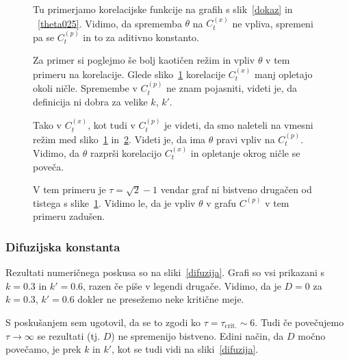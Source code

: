 \documentclass[a4paper, 12pt]{article}
\begin{document}
\begin{figure}[H]\centering
	
	\caption{Tu primerjamo korelacijske funkcije na grafih s slik~\ref{dokaz} in ~\ref{theta025}. Vidimo, da sprememba
		$\theta$ na $C^{(x)}_t$ ne vpliva, spremeni pa se $C^{(p)}_t$ in to za aditivno konstanto.}
	\label{korelacije}
\end{figure}

\begin{figure}[H]\centering
	
	\caption{Za primer si poglejmo \v se bolj kaoti\v cen re\v zim in vpliv $\theta$ v tem primeru na korelacije.
		Glede sliko~\ref{korelacije} korelacije $C^{(x)}_t$ manj opletajo okoli ni\v cle. Spremembe v
		$C^{(p)}_t$ ne znam pojasniti, videti je, da definicija ni dobra za velike $k$, $k'$.}
	\label{korelacije2}
\end{figure}

\begin{figure}[H]\centering
	
	\caption{Tako v $C^{(x)}_t$, kot tudi v $C^{(p)}_t$ je videti, da smo naleteli na vmesni re\v zim med
		sliko~\ref{korelacije} in~\ref{korelacije2}. Videti je, da ima $\theta$ pravi vpliv na $C^{(p)}_t$.
		Vidimo, da $\theta$ razpr\v si korelacijo $C^{(x)}_t$ in opletanje okrog ni\v cle se pove\v ca.}
	\label{korelacije3}
\end{figure}

\begin{figure}[H]\centering
	
	\caption{V tem primeru je $\tau = \sqrt{2}-1$ vendar graf ni bistveno druga\v cen od tistega s slike~\ref{korelacije}.
		Vidimo le, da je vpliv $\theta$ v grafu $C^{(p)}$ v tem primeru zadu\v sen.}
	\label{korelacije4}
\end{figure}

\subsubsection{Difuzijska konstanta}

Rezultati numeri\v cnega poskusa so na sliki~\ref{difuzija}. Grafi so vsi prikazani s $k = 0.3$ in $k' = 0.6$, razen \v ce
pi\v se v legendi druga\v ce. Vidimo, da je $D = 0$ za $k = 0.3$, $k' = 0.6$ dokler ne
prese\v zemo neke kriti\v cne meje.

S posku\v sanjem sem ugotovil, da se to zgodi ko $\tau = \tau_\text{crit.} \sim 6$. Tudi \v ce pove\v cujemo $\tau \to \infty$
se rezultati (tj. $D$) ne spremenijo bistveno. Edini na\v cin, da $D$ mo\v cno pove\v camo, je prek $k$ in $k'$, kot se tudi
vidi na sliki~\ref{difuzija}.
\end{document}
